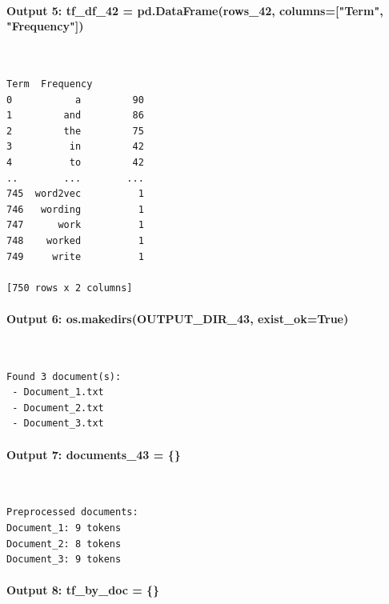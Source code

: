 \documentclass[12pt,a4paper,oneside]{report}
\begin{document}
\paragraph{Output 5: tf\_df\_42 = pd.DataFrame(rows\_42, columns=["Term", "Frequency"])}\mbox{}\\[-1ex]
\begin{Verbatim}[commandchars=\\\{\},breaklines=true,breakanywhere=true,fontsize=\scriptsize,frame=leftline,framesep=2mm,rulecolor=\color{gray}]
         Term  Frequency
0           a         90
1         and         86
2         the         75
3          in         42
4          to         42
..        ...        ...
745  word2vec          1
746   wording          1
747      work          1
748    worked          1
749     write          1

[750 rows x 2 columns]
\end{Verbatim}
\paragraph{Output 6: os.makedirs(OUTPUT\_DIR\_43, exist\_ok=True)}\mbox{}\\[-1ex]
\begin{Verbatim}[commandchars=\\\{\},breaklines=true,breakanywhere=true,fontsize=\scriptsize,frame=leftline,framesep=2mm,rulecolor=\color{gray}]
Found 3 document(s):
 - Document_1.txt
 - Document_2.txt
 - Document_3.txt
\end{Verbatim}
\paragraph{Output 7: documents\_43 = \{\}}\mbox{}\\[-1ex]
\begin{Verbatim}[commandchars=\\\{\},breaklines=true,breakanywhere=true,fontsize=\scriptsize,frame=leftline,framesep=2mm,rulecolor=\color{gray}]
Preprocessed documents:
Document_1: 9 tokens
Document_2: 8 tokens
Document_3: 9 tokens
\end{Verbatim}
\paragraph{Output 8: tf\_by\_doc = \{\}}\mbox{}\\[-1ex]
\end{document}
